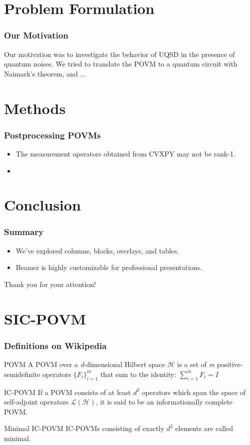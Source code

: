 \documentclass{beamer}
\begin{document}
\section{Problem Formulation}
\begin{frame}
  \frametitle{Our Motivation}
  Our motivation was to investigate the behavior of UQSD in the presence
  of quantum noises. We tried to translate the POVM to a quantum circuit
  with Naimark's theorem, and ...
\end{frame}

\section{Methods}
\begin{frame}
  \frametitle{Postprocessing POVMs}
  \begin{itemize}
    \item The measurement operators obtained from CVXPY may not be rank-1.
    \item
  \end{itemize}
\end{frame}

\section{Conclusion}
\begin{frame}
  \frametitle{Summary}
  \begin{itemize}
    \item We've explored columns, blocks, overlays, and tables.
    \item Beamer is highly customizable for professional presentations.
  \end{itemize}
  \vfill
  \begin{center}
    \alert{Thank you for your attention!}
  \end{center}
\end{frame}

\section{SIC-POVM}
\begin{frame}
  \frametitle{Definitions on Wikipedia}
  \begin{block}{POVM}
    A POVM over a \textit{d}-dimensional Hilbert space $\mathcal{H}$ is a set of
    \textit{m} positive-semidefinite operators ${\{F_{i}\}^{m}_{i=1}}$ that sum to the identity:
    $\sum_{i=1}^{m}F_{i}=I$
  \end{block}
  \begin{block}{IC-POVM}
    If a POVM consists of at least $d^2$ operators which span the space of self-adjoint operators
    $\mathcal{L(H)}$, it is said to be an informationally complete POVM.
  \end{block}
  \begin{block}{Minimal IC-POVM}
    IC-POVMs consisting of exactly $d^2$ elements are called minimal.
  \end{block}
\end{frame}
\end{document}
